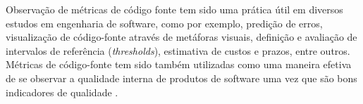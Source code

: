 %
%
%

Observação de métricas de código fonte tem sido uma prática útil em diversos
estudos em engenharia de software, como por exemplo, predição de erros,
visualização de código-fonte através de metáforas visuais, definição e
avaliação de intervalos de referência ({\it thresholds}), estimativa de custos e prazos, entre outros.
Métricas de código-fonte tem sido também utilizadas como uma maneira efetiva
de se observar a qualidade interna de produtos de software \cite{Meirelles2013}
uma vez que são bons indicadores de qualidade \cite{Basili1996}.



